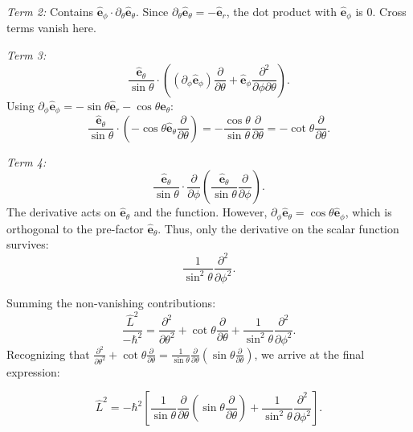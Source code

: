 \textit{Term 2:} Contains $\hat{\mathbf{e}}_\phi \cdot \partial_\theta
\hat{\mathbf{e}}_\theta$. Since $\partial_\theta \hat{\mathbf{e}}_\theta =
-\hat{\mathbf{e}}_r$, the dot product with $\hat{\mathbf{e}}_\phi$ is 0. Cross
terms vanish here.

\textit{Term 3:}
\[ \frac{\hat{\mathbf{e}}_\theta}{\sin\theta} \cdot \left( (\partial_\phi
\hat{\mathbf{e}}_\phi) \frac{\partial}{\partial \theta} + \hat{\mathbf{e}}_\phi
\frac{\partial^2}{\partial \phi \partial \theta} \right). \]
Using $\partial_\phi \hat{\mathbf{e}}_\phi = -\sin\theta \hat{\mathbf{e}}_r -
\cos\theta \hat{\mathbf{e}}_\theta$:
\[ \frac{\hat{\mathbf{e}}_\theta}{\sin\theta} \cdot \left( -\cos\theta
\hat{\mathbf{e}}_\theta \frac{\partial}{\partial \theta} \right) =
-\frac{\cos\theta}{\sin\theta} \frac{\partial}{\partial \theta} = -\cot\theta
\frac{\partial}{\partial \theta}. \]

\textit{Term 4:}
\[ \frac{\hat{\mathbf{e}}_\theta}{\sin\theta} \cdot \frac{\partial}{\partial
\phi} \left( \frac{\hat{\mathbf{e}}_\theta}{\sin\theta} \frac{\partial}{\partial
\phi} \right). \]
The derivative acts on $\hat{\mathbf{e}}_\theta$ and the function. However,
$\partial_\phi \hat{\mathbf{e}}_\theta = \cos\theta \hat{\mathbf{e}}_\phi$,
which is orthogonal to the pre-factor $\hat{\mathbf{e}}_\theta$. Thus, only the
derivative on the scalar function survives:
\[ \frac{1}{\sin^2\theta} \frac{\partial^2}{\partial \phi^2}. \]

Summing the non-vanishing contributions:
\begin{equation}
  \frac{\hat{L}^2}{-\hbar^2} = \frac{\partial^2}{\partial \theta^2} + \cot\theta
  \frac{\partial}{\partial \theta} + \frac{1}{\sin^2\theta}\frac{\partial^2}
  {\partial \phi^2}.
\end{equation}
Recognizing that $\frac{\partial^2}{\partial \theta^2} + \cot\theta
\frac{\partial}{\partial \theta} = \frac{1}{\sin\theta}\frac{\partial}{\partial
\theta}\left(\sin\theta \frac{\partial}{\partial \theta}\right)$, we arrive at
the final expression:

\begin{equation}
  \hat{L}^2 = -\hbar^2 \left[ \frac{1}{\sin\theta}\frac{\partial}{\partial
  \theta}\left(\sin\theta \frac{\partial}{\partial \theta}\right) +
  \frac{1}{\sin^2\theta}\frac{\partial^2}{\partial \phi^2} \right].
\end{equation}
